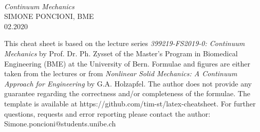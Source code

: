 \documentclass[10pt,landscape,a4paper]{article}
\begin{document}
\begin{titlepage} %

	\centering %
	
\vspace*{3.5cm}
	\setlength{\unitlength}{0.2\textwidth} %
	
	{\color{myblue}}\\[\baselineskip] %
	
	\textcolor{myred}{\textit{\Huge Continuum Mechanics}}\\[\baselineskip]
	
	{\color{myred}\Large SIMONE PONCIONI, BME }\\ [\baselineskip] %
	{\color{myred}\large 02.2020 }\\ %

	{\color{myblue}} %
	\vspace*{5cm} %

\begin{minipage}{0.6\textwidth}
This cheat sheet is based on the lecture series \textit{399219-FS2019-0: Continuum Mechanics} by Prof. Dr. Ph. Zysset of the Master's Program in Biomedical Engineering (BME) at the University of Bern. Formulae and figures are either taken from the lectures or from \textit{Nonlinear Solid Mechanics: A Continuum Approach for Engineering} by G.A. Holzapfel. The author does not provide any guarantee regarding the correctness and/or completeness of the formulae.
The template is available at https://github.com/tim-st/latex-cheatsheet.
For further questions, requests and error reporting please contact the author: Simone.poncioni@students.unibe.ch
\end{minipage}		

	\vfill %
	
	
\begin{figure}[htpb]%
    \centering
    \hspace{8cm}
\end{figure}

\end{titlepage}
\end{document}
